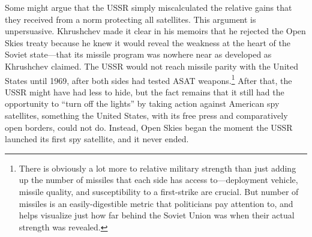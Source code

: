 \documentclass[14pt]{extarticle}
\begin{document}
Some might argue that the USSR simply miscalculated the relative gains that they received from a norm protecting all satellites. This argument is unpersuasive. Khrushchev made it clear in his memoirs that he rejected the Open Skies treaty because he knew it would reveal the weakness at the heart of the Soviet state---that its missile program was nowhere near as developed as Khrushchev claimed. The USSR would not reach missile parity with the United States until 1969, after both sides had tested ASAT weapons.\footnote{There is obviously a lot more to relative military strength than just adding up the number of missiles that each side has access to---deployment vehicle, missile quality, and susceptibility to a first-strike are crucial. But number of missiles is an easily-digestible metric that politicians pay attention to, and helps visualize just how far behind the Soviet Union was when their actual strength was revealed.} After that, the USSR might have had less to hide, but the fact remains that it still had the opportunity to ``turn off the lights'' by taking action against American spy satellites, something the United States, with its free press and comparatively open borders, could not do. Instead, Open Skies began the moment the USSR launched its first spy satellite, and it never ended.

\end{document}

